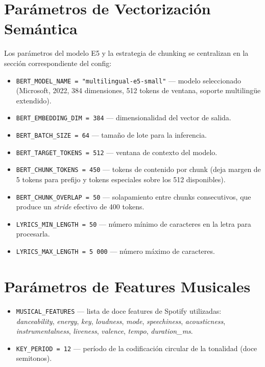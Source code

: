 \section{Parámetros de Vectorización Semántica}

Los parámetros del modelo E5 y la estrategia de chunking se centralizan en la sección correspondiente del config:

\begin{itemize}[leftmargin=2em]
    \item \texttt{BERT\_MODEL\_NAME = "multilingual-e5-small"} --- modelo seleccionado (Microsoft, 2022, 384 dimensiones, 512 tokens de ventana, soporte multilingüe extendido).
    \item \texttt{BERT\_EMBEDDING\_DIM = 384} --- dimensionalidad del vector de salida.
    \item \texttt{BERT\_BATCH\_SIZE = 64} --- tamaño de lote para la inferencia.
    \item \texttt{BERT\_TARGET\_TOKENS = 512} --- ventana de contexto del modelo.
    \item \texttt{BERT\_CHUNK\_TOKENS = 450} --- tokens de contenido por chunk (deja margen de 5 tokens para prefijo y tokens especiales sobre los 512 disponibles).
    \item \texttt{BERT\_CHUNK\_OVERLAP = 50} --- solapamiento entre chunks consecutivos, que produce un \textit{stride} efectivo de 400 tokens.
    \item \texttt{LYRICS\_MIN\_LENGTH = 50} --- número mínimo de caracteres en la letra para procesarla.
    \item \texttt{LYRICS\_MAX\_LENGTH = 5\,000} --- número máximo de caracteres.
\end{itemize}

\section{Parámetros de Features Musicales}

\begin{itemize}[leftmargin=2em]
    \item \texttt{MUSICAL\_FEATURES} --- lista de doce features de Spotify utilizadas: \textit{danceability}, \textit{energy}, \textit{key}, \textit{loudness}, \textit{mode}, \textit{speechiness}, \textit{acousticness}, \textit{instrumentalness}, \textit{liveness}, \textit{valence}, \textit{tempo}, \textit{duration\_ms}.
    \item \texttt{KEY\_PERIOD = 12} --- período de la codificación circular de la tonalidad (doce semitonos).
\end{itemize}

